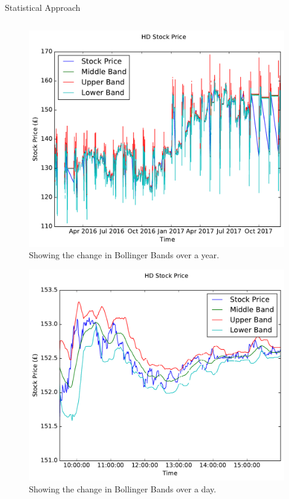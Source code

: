 \documentclass[final]{beamer}
\begin{document}
\begin{frame}{}
\begin{columns}[t]
\begin{column}{.48\linewidth}
\begin{block}{Statistical Approach}
         \begin{columns}[t]
         
         \begin{column}{0.48\linewidth}
         
         \begin{figure}[h!]
         \centering
         \includegraphics[width=0.95\columnwidth]{../HDYearBollinger.pdf}
         \caption{Showing the change in Bollinger Bands over a year.}
         \label{fig: HDYearBollinger}
         \end{figure}
         
         \begin{figure}[h!]
         \centering
         \includegraphics[width=0.95\columnwidth]{../HDDayBollinger.pdf}
         \caption{Showing the change in Bollinger Bands over a day.}
         \label{fig: HDDayBollinger}
         \end{figure}
         

\end{column}
\end{columns}
\end{block}
\end{column}
\end{columns}
\end{frame}
\end{document}
